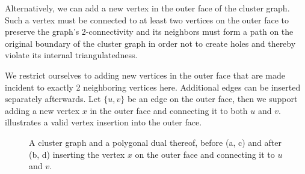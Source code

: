 Alternatively, we can add a new vertex in the outer face of the cluster graph.
Such a vertex must be connected to at least two vertices on the outer face to preserve the graph's 2-connectivity and its neighbors must form a path on the original boundary of the cluster graph in order not to create holes and thereby violate its internal triangulatedness.

We restrict ourselves to adding new vertices in the outer face that are made incident to exactly 2 neighboring vertices here.
Additional edges can be inserted separately afterwards.
Let $\{u,v\}$ be an edge on the outer face, then we support adding a new vertex $x$ in the outer face and connecting it to both $u$ and $v$.
 illustrates a valid vertex insertion into the outer face.

\begin{figure}[H]
	\centering
	\quad
	\qquad
	\quad
	\caption{A cluster graph and a polygonal dual thereof, before (a, c) and after (b, d) inserting the vertex $x$ on the outer face and connecting it to $u$ and $v$.}
	\label{fig:insert-vertex-example-outside}
\end{figure}

